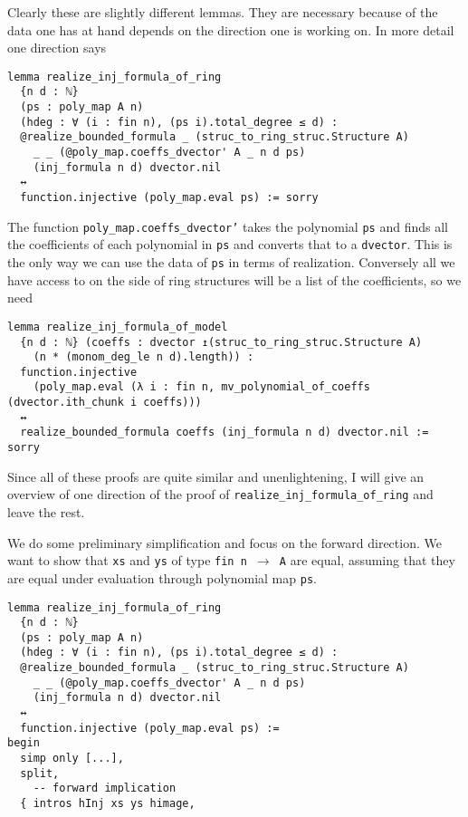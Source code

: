 Clearly these are slightly different lemmas.
They are necessary because of the data one has at hand
depends on the direction one is working on.
In more detail one direction says

\begin{lstlisting}
lemma realize_inj_formula_of_ring
  {n d : ℕ}
  (ps : poly_map A n)
  (hdeg : ∀ (i : fin n), (ps i).total_degree ≤ d) :
  @realize_bounded_formula _ (struc_to_ring_struc.Structure A)
    _ _ (@poly_map.coeffs_dvector' A _ n d ps)
    (inj_formula n d) dvector.nil
  ↔
  function.injective (poly_map.eval ps) := sorry \end{lstlisting}

The function \texttt{poly\_map.coeffs\_dvector'} takes the polynomial \texttt{ps}
and finds all the coefficients of each polynomial in \texttt{ps}
and converts that to a \texttt{dvector}.
This is the only way we can use the data of \texttt{ps} in terms of realization.
Conversely all we have access to on the side of ring structures
will be a list of the coefficients, so we need

\begin{lstlisting}
lemma realize_inj_formula_of_model
  {n d : ℕ} (coeffs : dvector ↥(struc_to_ring_struc.Structure A)
    (n * (monom_deg_le n d).length)) :
  function.injective
    (poly_map.eval (λ i : fin n, mv_polynomial_of_coeffs (dvector.ith_chunk i coeffs)))
  ↔
  realize_bounded_formula coeffs (inj_formula n d) dvector.nil := sorry
\end{lstlisting}

Since all of these proofs are quite similar and unenlightening,
I will give an overview of one direction of the proof of
\texttt{realize\_inj\_formula\_of\_ring} and leave the rest.

We do some preliminary simplification and focus on the forward direction.
We want to show that \texttt{xs} and \texttt{ys} of type \texttt{fin n $\to$ A} are equal,
assuming that they are equal under evaluation through polynomial map \texttt{ps}.

\begin{lstlisting}
lemma realize_inj_formula_of_ring
  {n d : ℕ}
  (ps : poly_map A n)
  (hdeg : ∀ (i : fin n), (ps i).total_degree ≤ d) :
  @realize_bounded_formula _ (struc_to_ring_struc.Structure A)
    _ _ (@poly_map.coeffs_dvector' A _ n d ps)
    (inj_formula n d) dvector.nil
  ↔
  function.injective (poly_map.eval ps) :=
begin
  simp only [...],
  split,
    -- forward implication
  { intros hInj xs ys himage, \end{lstlisting}

